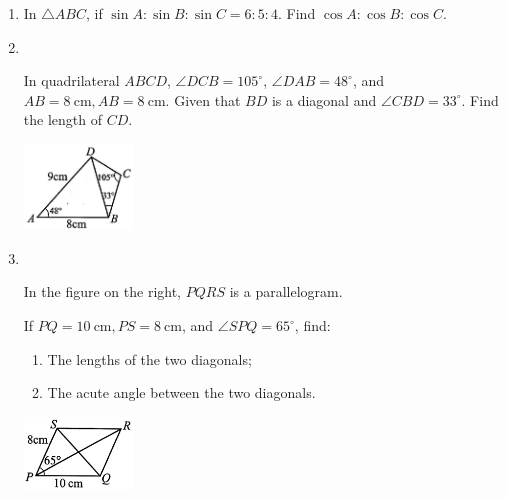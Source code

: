 \documentclass{report}
\begin{document}
\begin{enumerate}
        \item In $\triangle ABC$, if $\sin A: \sin B: \sin C = 6: 5: 4$. Find $\cos A: \cos B: \cos C$.

        \item \parbox[t]{0.9\textwidth}{
            ~
            \vspace{-1.1em}
            \begin{vwcol}[widths={0.7,0.3}, sep=8mm, rule=0pt]
                In quadrilateral $ABCD$, $\angle DCB = 105^\circ$, $\angle DAB = 48^\circ$, and $AB = 8 \mathrm{~cm}, AB = 8 \mathrm{~cm}$. Given that $BD$ is a diagonal and $\angle CBD = 33^\circ$. Find the length of $CD$.
    
                \includegraphics[width=0.23\textwidth]{assets/10-29.jpg}
            \end{vwcol}
        }

        \vspace{4em}
        \item \parbox[t]{0.9\textwidth}{
            ~
            \vspace{-1.3em}
            \begin{vwcol}[widths={0.7,0.3}, sep=8mm, rule=0pt]
                In the figure on the right, $PQRS$ is a parallelogram.

                \noindent If $PQ = 10 \mathrm{~cm}, PS = 8 \mathrm{~cm}$, and $\angle SPQ = 65^\circ$, find:

                \vspace{0.5em}
                \noindent\parbox{0.5\textwidth}{
                    \begin{enumerate}
                        \item The lengths of the two diagonals;
                        \item The acute angle between the two diagonals.
                    \end{enumerate}}
    
                \includegraphics[width=0.23\textwidth]{assets/10-30.jpg}
            \end{vwcol}
        }


\end{enumerate}
\end{document}
